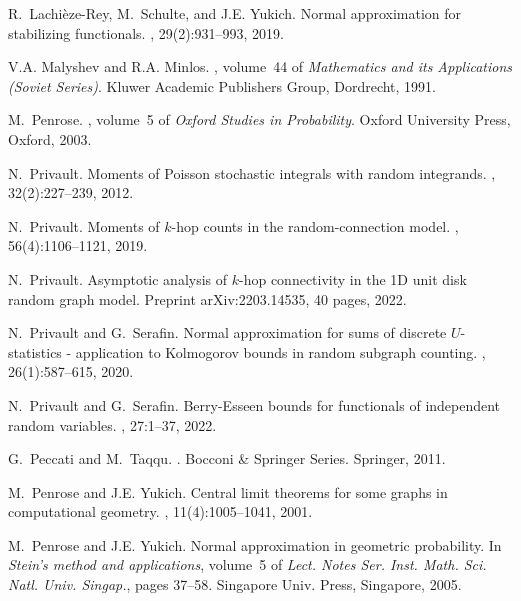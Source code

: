 \documentclass[12pt]{article}
\numberwithin{equation}{section}
\begin{document}
\begin{thebibliography}{BRSW17}
R.~Lachi\`eze-Rey, M.~Schulte, and J.E. Yukich.
\newblock Normal approximation for stabilizing functionals.
, 29(2):931--993, 2019.

V.A. Malyshev and R.A. Minlos.
, volume~44 of {\em Mathematics and its
  Applications (Soviet Series)}.
\newblock Kluwer Academic Publishers Group, Dordrecht, 1991.

M.~Penrose.
, volume~5 of {\em Oxford Studies in
  Probability}.
\newblock Oxford University Press, Oxford, 2003.

N.~Privault.
\newblock Moments of {P}oisson stochastic integrals with random integrands.
, 32(2):227--239, 2012.

N.~Privault.
\newblock Moments of $k$-hop counts in the random-connection model.
, 56(4):1106--1121, 2019.

N.~Privault.
\newblock Asymptotic analysis of $k$-hop connectivity in the 1{D} unit disk
  random graph model.
\newblock Preprint arXiv:2203.14535, 40 pages, 2022.

N.~Privault and G.~Serafin.
\newblock Normal approximation for sums of discrete {$U$}-statistics -
  application to {K}olmogorov bounds in random subgraph counting.
, 26(1):587--615, 2020.

N.~Privault and G.~Serafin.
\newblock Berry-{E}sseen bounds for functionals of independent random
  variables.
, 27:1--37, 2022.

G.~Peccati and M.~Taqqu.
.
\newblock Bocconi \& Springer Series. Springer, 2011.

M.~Penrose and J.E. Yukich.
\newblock Central limit theorems for some graphs in computational geometry.
, 11(4):1005--1041, 2001.

M.~Penrose and J.E. Yukich.
\newblock Normal approximation in geometric probability.
\newblock In {\em Stein's method and applications}, volume~5 of {\em Lect.
  Notes Ser. Inst. Math. Sci. Natl. Univ. Singap.}, pages 37--58. Singapore
  Univ. Press, Singapore, 2005.


\end{thebibliography}
\end{document}
